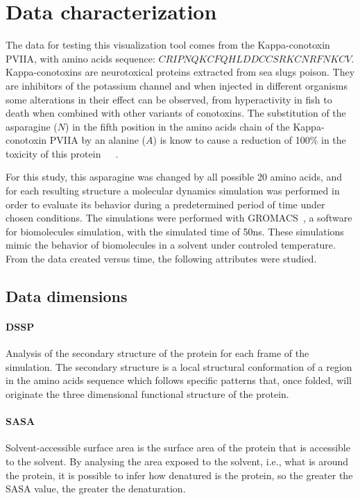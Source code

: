 \documentclass[10pt, conference]{IEEEtran}
\begin{document}
\section{Data characterization}

The data for testing this visualization tool comes from the Kappa-conotoxin PVIIA, with amino acids sequence: $CRIPNQKCFQHLDDCCSRKCNRFNKCV$. Kappa-conotoxins are neurotoxical proteins extracted from sea slugs poison. They are inhibitors of the potassium channel and when injected in different organisms some alterations in their effect can be observed, from hyperactivity in fish to death when combined with other variants of conotoxins. The substitution of the asparagine ($N$) in the fifth position in the amino acids chain of the Kappa-conotoxin PVIIA by an alanine ($A$) is know to cause a reduction of 100\% in the toxicity of this protein~\cite{jacobsen2000single}~\cite{mir2016conotoxins}~\cite{akey2002inherited}.

For this study, this asparagine was changed by all possible 20 amino acids, and for each resulting structure a molecular dynamics simulation was performed in order to evaluate its behavior during a predetermined period of time under chosen conditions. The simulations were performed with GROMACS~\cite{hess2008gromacs}, a software for biomolecules simulation, with the simulated time of 50ns. These simulations mimic the behavior of biomolecules in a solvent under controled temperature. From the data created versus time, the following attributes were studied.

\subsection{Data dimensions}

\paragraph*{DSSP} Analysis of the secondary structure of the protein for each frame of the simulation. The secondary structure is a local structural conformation of a region in the amino acids sequence which follows specific patterns that, once folded, will originate the three dimensional functional structure of the protein. 
%

\paragraph*{SASA} Solvent-accessible surface area is the surface area of the protein that is accessible to the solvent. By analysing the area exposed to the solvent, i.e., what is around the protein, it is possible to infer how denatured is the protein, so the greater the SASA value, the greater the denaturation.
%
\end{document}

